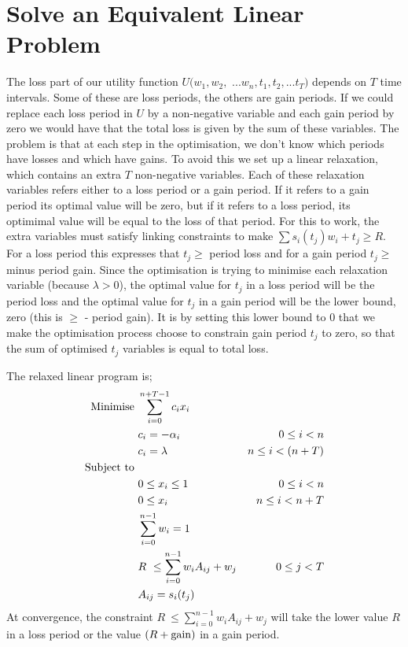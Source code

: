 \documentclass[12pt]{article}
\begin{document}
\section{Solve an Equivalent Linear Problem}
The loss part of our utility function $U(w_1,w_2,$ $...w_n,t_1,t_2,...t_T)$ depends on $T$ time intervals. Some of these
are loss periods, the others are gain periods. If we could replace each loss period in $U$ by a non-negative variable and each gain period by
zero we would have that the total loss is given by the sum of these variables. The problem is that at each step in the optimisation,
we don't know which periods have losses and which have gains. To avoid this we set up a linear relaxation, which contains an extra $T$ non-negative variables. Each of these relaxation variables
refers either to a loss period or a gain period. If it refers to a gain period its optimal value will be zero, but if it refers to a loss period,
its optimimal value will be equal to the loss of that period. For this to work, the extra variables must satisfy
linking constraints to make $\sum s_i( t_j )w_i +t_j \ge R$. For a loss period this expresses that $t_j \ge$ period loss and for a gain period
$t_j \ge$ minus period gain. Since the optimisation is trying to minimise each relaxation variable (because $\lambda > 0$), the optimal value 
for $t_j$ in a loss period will be the period loss and the optimal value for $t_j$ in a gain period will be the lower bound, zero (this is $\ge$ - period gain).
It is by setting this lower bound to 0 that we make the optimisation process choose to constrain gain period 
$t_j$ to zero, so that the sum of optimised $t_j$ variables is equal to total loss.

The relaxed linear program is;
\begin{align*}
    {\rm Minimise}\ & \sum_{i=0}^{n+T-1} c_i x_i\cr
    & c_i=-\alpha_i &0\le i < n\cr
    &c_i =\lambda &n\le i < (n+T)\cr
    {\rm Subject\ to}\ &\cr& 0 \le x_i \le 1\ &0\le i < n\cr
    & 0 \le x_i \ &n\le i < n+T\cr
    & \sum_{i=0}^{n-1} w_i = 1\cr
    & R\ \le\sum_{i=0}^{n-1} w_i A_{ij} + w_j  &0\le j < T\cr
    & A_{ij} = s_i(t_j )\cr
\end{align*}
At convergence, the constraint $R\ \le\sum_{i=0}^{n-1} w_i A_{ij} + w_j$ will take the lower value $R$ in a loss period or the value $(R+{\rm gain})$ in a gain period.
\end{document}
